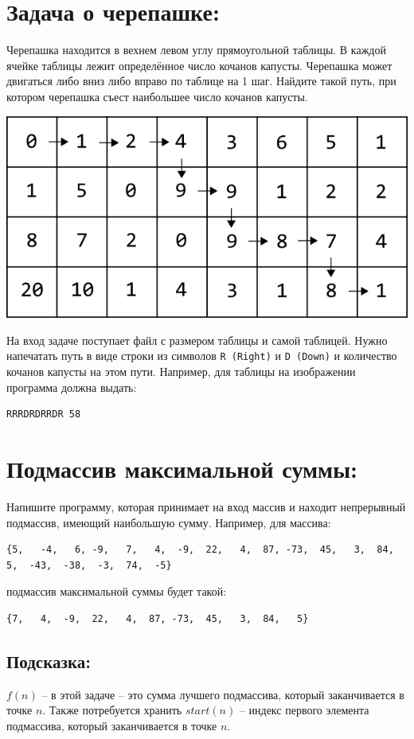 \documentclass{article}
\begin{document}
\section*{Задача о черепашке:}
Черепашка находится в вехнем левом углу прямоугольной таблицы. В каждой ячейке таблицы лежит определённое число кочанов капусты. Черепашка может двигаться либо вниз либо вправо по таблице на 1 шаг. Найдите такой путь, при котором черепашка съест наибольшее число кочанов капусты.
\begin{center}
\includegraphics[scale=0.8]{../images/turtle.png}
\end{center}
На вход задаче поступает файл с размером таблицы и самой таблицей. Нужно напечатать путь в виде строки из символов \texttt{R (Right)} и \texttt{D (Down)} и количество кочанов капусты на этом пути. Например, для таблицы на изображении программа должна выдать:
\begin{verbatim}
RRRDRDRRDR 58
\end{verbatim}

\section*{Подмассив максимальной суммы:}
Напишите программу, которая принимает на вход массив и находит непрерывный подмассив, имеющий наибольшую сумму. Например, для массива:
\begin{verbatim}
{5,   -4,   6, -9,   7,   4,  -9,  22,   4,  87, -73,  45,   3,  84,   5,  -43,  -38,  -3,  74,  -5}
\end{verbatim}
подмассив максимальной суммы будет такой:
\begin{verbatim}
{7,   4,  -9,  22,   4,  87, -73,  45,   3,  84,   5}
\end{verbatim}
\subsection*{Подсказка:}
$f(n)$ -- в этой задаче -- это сумма лучшего подмассива, который заканчивается в точке $n$. Также потребуется хранить $start(n)$ -- индекс первого элемента подмассива, который заканчивается в точке $n$.
\end{document}
